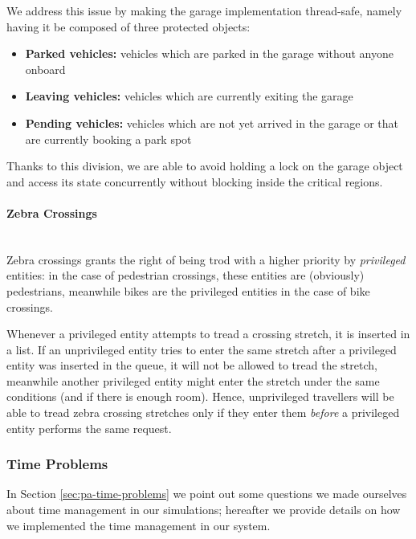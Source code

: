We address this issue by making the garage implementation thread-safe, namely
having it be composed of three protected objects:

\begin{itemize}
  \item \textbf{Parked vehicles:} vehicles which are parked in the garage
    without anyone onboard
  \item \textbf{Leaving vehicles:} vehicles which are currently exiting the
    garage
  \item \textbf{Pending vehicles:} vehicles which are not yet arrived in the
    garage or that are currently booking a park spot
\end{itemize}

Thanks to this division, we are able to avoid holding a lock on the garage
object and access its state concurrently without blocking inside the critical
regions.

\paragraph{Zebra Crossings} \mbox{} \\
Zebra crossings grants the right of being trod with a higher priority by
\textit{privileged} entities: in the case of pedestrian crossings, these
entities are (obviously) pedestrians, meanwhile bikes are the privileged
entities in the case of bike crossings.

Whenever a privileged entity attempts to tread a crossing stretch, it is
inserted in a list. If an unprivileged entity tries to enter the same stretch
after a privileged entity was inserted in the queue, it will not be allowed to
tread the stretch, meanwhile another privileged entity might enter the stretch
under the same conditions (and if there is enough room).
Hence, unprivileged travellers will be able to tread zebra crossing stretches
only if they enter them \textit{before} a privileged entity performs the same
request.



\subsubsection{Time Problems}

In Section \ref{sec:pa-time-problems} we point out some questions we made
ourselves about time management in our simulations; hereafter we provide
details on how we implemented the time management in our system.

